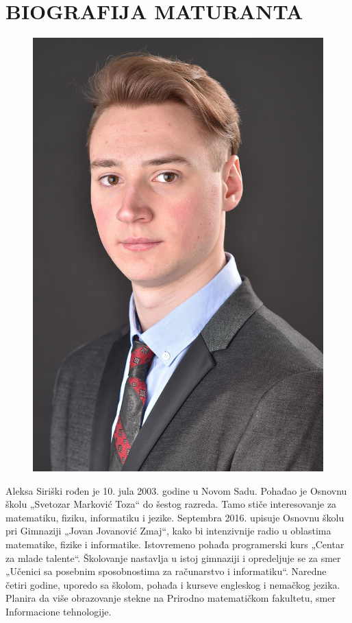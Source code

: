 \documentclass[a4paper,14pt]{article}
\begin{document}
\section{BIOGRAFIJA MATURANTA}
\begin{figure}
\centering
\includegraphics[width=.90\linewidth]{Maturska}
\end{figure}
Aleksa Siriški rođen je 10. jula 2003. godine u Novom Sadu. Pohađao je Osnovnu školu „Svetozar Marković Toza“ do šestog razreda. Tamo stiče interesovanje za matematiku, fiziku, informatiku i jezike. Septembra 2016. upisuje Osnovnu školu pri Gimnaziji „Jovan Jovanović Zmaj“, kako bi intenzivnije radio u oblastima matematike, fizike i informatike. Istovremeno pohađa programerski kurs „Centar za mlade talente“. Školovanje nastavlja u istoj gimnaziji i opredeljuje se za smer „Učenici sa posebnim sposobnostima za računarstvo i informatiku“. Naredne četiri godine, uporedo sa školom, pohađa i kurseve engleskog i nemačkog jezika. Planira da više obrazovanje stekne na Prirodno matematičkom fakultetu, smer Informacione tehnologije.
\newpage
\end{document}
